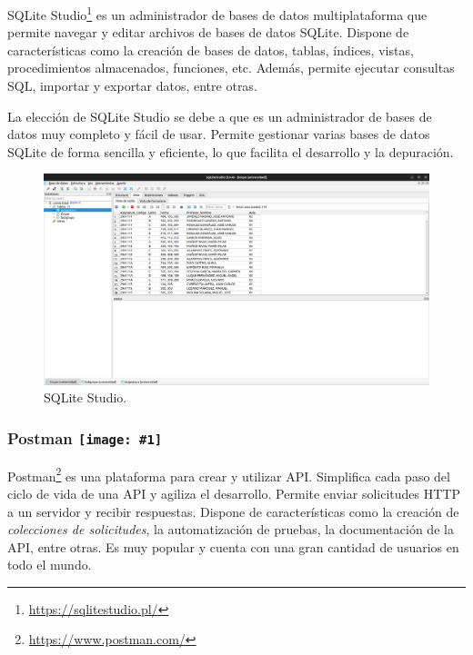 SQLite Studio\footnote{\url{https://sqlitestudio.pl/}} es un administrador de bases de datos multiplataforma que permite navegar y editar archivos de bases de datos SQLite. Dispone de características como la creación de bases de datos, tablas, índices, vistas, procedimientos almacenados, funciones, etc. Además, permite ejecutar consultas SQL, importar y exportar datos, entre otras.\newline

La elección de SQLite Studio se debe a que es un administrador de bases de datos muy completo y fácil de usar. Permite gestionar varias bases de datos SQLite de forma sencilla y eficiente, lo que facilita el desarrollo y la depuración.\newline

\begin{figure}[H]
    \centering
    \includegraphics[width=1\textwidth]{./imagenes/SQLiteStudio.png}
    \caption{SQLite Studio.}
\end{figure}

\renewcommand{\icon}[1]{\texttt{[image: \#1]}}
\subsubsection*{Postman \protect\icon{./imagenes/postman_logo.png}}



Postman\footnote{\url{https://www.postman.com/}} es una plataforma para crear y utilizar API. Simplifica cada paso del ciclo de vida de una API y agiliza el desarrollo. Permite enviar solicitudes HTTP a un servidor y recibir respuestas. Dispone de características como la creación de \textit{colecciones de solicitudes}, la automatización de pruebas, la documentación de la API, entre otras. Es muy popular y cuenta con una gran cantidad de usuarios en todo el mundo.\newline

